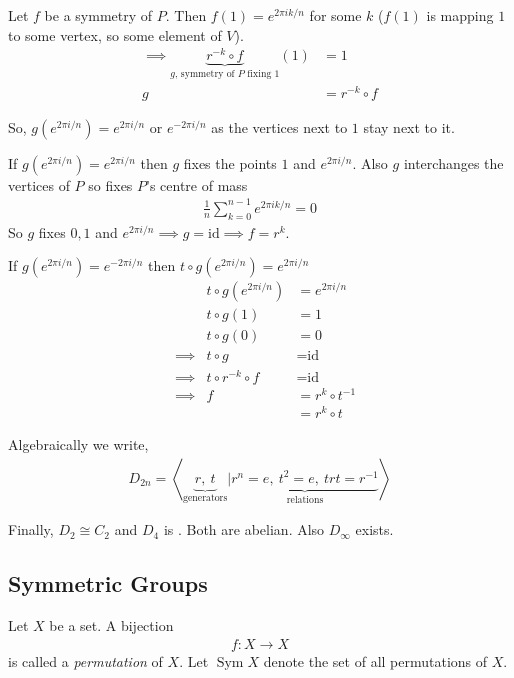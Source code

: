 Let \(f\) be a symmetry of \(P\). Then \(f(1) = e^{2 \pi i k /n}\) for some \(k\) (\(f(1)\) is mapping $1$ to some vertex, so some element of \(V\)).
\begin{align*}
    \implies \underbrace{r^{-k} \circ f}_\text{$g$, symmetry of $P$ fixing $1$}(1) &= 1 \\
    g &= r^{-k} \circ f
\end{align*}

So, \(g(e^{2 \pi i /n}) = e^{2 \pi i /n}\) or \(e^{-2 \pi i /n}\) as the vertices next to $1$ stay next to it.

If \(g(e^{2 \pi i /n}) = e^{2 \pi i /n}\) then \(g\) fixes the points \(1\) and \(e^{2 \pi i / n}\).
Also \(g\) interchanges the vertices of \(P\) so fixes \(P\)'s centre of mass
\begin{align*}
    \frac{1}{n} \sum_{k=0}^{n-1} e^{2 \pi i k /n} = 0
\end{align*}
So \(g\) fixes \(0, 1\) and \(e^{2 \pi i / n} \implies g = \text{id} \implies f = r^{k}\).

If \(g(e^{2 \pi i /n}) = e^{-2 \pi i /n}\) then \(t \circ g(e^{2 \pi i / n}) = e^{2 \pi i / n}\)
\begin{align*}
    && t \circ g(e^{2 \pi i / n}) &= e^{2 \pi i / n} \\
    && t \circ g (1) &= 1 \\
    && t \circ g (0) &= 0 \\
    &\implies & t \circ g &= \text{id} \\
    &\implies & t \circ r^{-k} \circ f &= \text{id} \\
    &\implies & f &= r^{k} \circ t^{-1} \\
    && &= r^k \circ t
\end{align*}

Algebraically we write,
\begin{align*}
    D_{2n} = \left\langle \underbrace{r,\ t}_\text{generators} | \underbrace{r^n = e,\ t^2 = e,\ trt = r^{-1}}_\text{relations} \right\rangle 
\end{align*}

Finally, \(D_2 \cong C_2\) and \(D_4\) is .
Both are abelian.
Also \(D_\infty\) exists.

\hypertarget{symmetric-groups}{%
\subsection{Symmetric Groups}\label{symmetric-groups}}

\begin{definition}[permutation] \label{def:permutation}
Let \(X\) be a set.
A bijection \begin{align*}
    f: X \to X
\end{align*} is called a \emph{permutation} of \(X\).
Let \(\operatorname{Sym} X\) denote the set of all permutations of \(X\).
\end{definition} 

